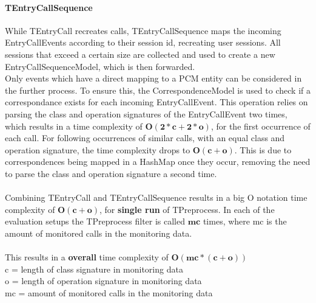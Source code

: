 \documentclass[10pt,a4paper]{article}
\begin{document}
\paragraph{TEntryCallSequence}
While TEntryCall recreates calls, TEntryCallSequence maps the incoming EntryCallEvents according to their session id, recreating user sessions. All sessions that exceed a certain size are collected and used to create a new EntryCallSequenceModel, which is then forwarded. \\
Only events which have a direct mapping to a PCM entity can be considered in the further process. To ensure this, the CorrespondenceModel is used to check if a correspondance exists for each incoming EntryCallEvent. This operation relies on parsing the class and operation signatures of the EntryCallEvent two times, which results in a time complexity of $\mathbf{O(2 * c + 2 * o)}$, for the first occurrence of each call. For following occurrences of similar calls, with an equal class and operation signature, the time complexity drops to $\mathbf{O(c + o)}$. This is due to correspondences being mapped in a HashMap once they occur, removing the need to parse the class and operation signature a second time.\\
\\
Combining TEntryCall and TEntryCallSequence results in a big O notation time complexity of $\mathbf{O(c + o)}$, for \textbf{single run} of TPreprocess. In each of the evaluation setups the TPreprocess filter is called $\mathbf{mc}$ times, where mc is the amount of monitored calls in the monitoring data.\\
\\
This results in a \textbf{overall} time complexity of $\mathbf{O(mc * (c + o))}$ \\
c = length of class signature in monitoring data\\
o = length of operation signature in monitoring data\\
mc = amount of monitored calls in the monitoring data
\end{document}
